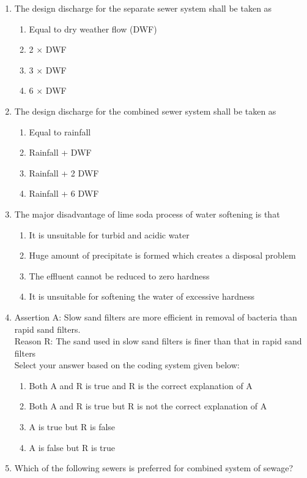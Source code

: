 \documentclass[11pt,a4paper]{article}
\begin{document}
\begin{enumerate}
\begin{enumerate}[label=\Alph*.]
\end{enumerate}
\item{The design discharge for the separate sewer system shall be taken as}
\begin{enumerate}[label=\Alph*.]
\item{Equal to dry weather flow (DWF)}
\item{2 $\times$ DWF}
\item{3 $\times$ DWF}
\item{6 $\times$ DWF}
\end{enumerate}
\item{The design discharge for the combined sewer system shall be taken as}
\begin{enumerate}[label=\Alph*.]
\item{Equal to rainfall}
\item{Rainfall + DWF}
\item{Rainfall + 2 DWF}
\item{Rainfall + 6 DWF}
\end{enumerate}
\item{The major disadvantage of lime soda process of water softening is that}
\begin{enumerate}[label=\Alph*.]
\item{It is unsuitable for turbid and acidic water}
\item{Huge amount of precipitate is formed which creates a disposal problem}
\item{The effluent cannot be reduced to zero hardness}
\item{It is unsuitable for softening the water of excessive hardness}
\end{enumerate}
\item{Assertion A: Slow sand filters are more efficient in removal of bacteria than rapid sand filters. \\
Reason R: The sand used in slow sand filters is finer than that in rapid sand filters \\
Select your answer based on the coding system given below:}
\begin{enumerate}[label=\Alph*.]
\item{Both A and R is true and R is the correct explanation of A}
\item{Both A and R is true but R is not the correct explanation of A}
\item{A is true but R is false}
\item{A is false but R is true}
\end{enumerate}
\item{Which of the following sewers is preferred for combined system of sewage?}

\end{enumerate}
\end{document}
